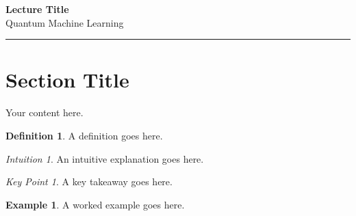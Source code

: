 \documentclass[11pt,a4paper]{article}
\theoremstyle{definition}
\newtheorem{definition}{Definition}[section]
\newtheorem{example}{Example}[section]
\theoremstyle{remark}
\newtheorem*{intuition}{Intuition}
\newtheorem*{keypoint}{Key Point}
\begin{document}
\begin{center}
    {\LARGE \textbf{Lecture Title}}\\[8pt]
    {\large Quantum Machine Learning}\\[12pt]
    \hrule
\end{center}

\vspace{12pt}
\tableofcontents
\newpage


\section{Section Title}

Your content here.

\begin{definition}
A definition goes here.
\end{definition}

\begin{intuition}
An intuitive explanation goes here.
\end{intuition}

\begin{keypoint}
A key takeaway goes here.
\end{keypoint}

\begin{example}
A worked example goes here.
\end{example}
\end{document}
